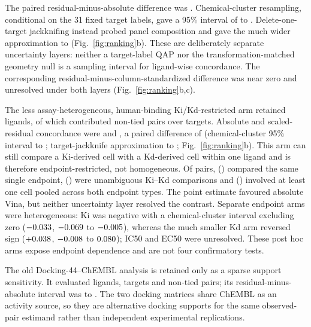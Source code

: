 \documentclass[11pt]{article}
\begin{document}
The paired residual-minus-absolute difference was \BroadRankingDelta{}. Chemical-cluster
resampling, conditional on the 31 fixed target labels, gave a 95\% interval of
\BroadRankingSamplingLow{} to \BroadRankingSamplingHigh{}. Delete-one-target jackknifing
instead probed panel composition and gave the much wider approximation
\BroadRankingTargetJackknifeLow{} to \BroadRankingTargetJackknifeHigh{}
(Fig.~\ref{fig:ranking}b). These are deliberately separate uncertainty layers: neither a
target-label QAP nor the transformation-matched geometry null is a sampling interval for
ligand-wise concordance. The corresponding residual-minus-column-standardized difference
was near zero and unresolved under both layers (Fig.~\ref{fig:ranking}b,c).

The less assay-heterogeneous, human-binding Ki/Kd-restricted arm retained
\BroadHumanKiKdRetainedLigands{} ligands,
of which \BroadHumanKiKdEvaluatedLigands{} contributed \BroadHumanKiKdPairs{} non-tied
pairs over \BroadHumanKiKdTargets{} targets. Absolute and scaled-residual concordance were
\BroadHumanKiKdAbsolute{} and \BroadHumanKiKdResidual{}, a paired difference of
\BroadHumanKiKdDelta{} (chemical-cluster 95\% interval
\BroadHumanKiKdSamplingLow{} to \BroadHumanKiKdSamplingHigh{}; target-jackknife
approximation \BroadHumanKiKdTargetJackknifeLow{} to
\BroadHumanKiKdTargetJackknifeHigh{}; Fig.~\ref{fig:ranking}b). This arm can still compare a
Ki-derived cell with a Kd-derived cell within one ligand and is therefore endpoint-restricted,
not homogeneous. Of \BroadHumanKiKdPairs{} pairs,
\BroadHumanKiKdSameEndpointPairs{} (\BroadHumanKiKdSameEndpointPercent{}) compared the same
single endpoint, \BroadHumanKiKdMixedEndpointPairs{}
(\BroadHumanKiKdMixedEndpointPercent{}) were unambiguous Ki--Kd comparisons and
\BroadHumanKiKdPooledCellPairs{} (\BroadHumanKiKdPooledCellPercent{}) involved at least one
cell pooled across both endpoint types. The point estimate favoured absolute Vina, but neither
uncertainty layer resolved the contrast. Separate endpoint arms were heterogeneous: Ki was
negative with a chemical-cluster interval excluding zero
($-0.033{}$, $-0.069{}$ to $-0.005{}$), whereas the much
smaller Kd arm reversed sign ($+0.038{}$, $-0.008{}$ to
$0.080{}$); IC50 and EC50 were unresolved. These post hoc arms expose
endpoint dependence and are not four confirmatory tests.

The old Docking-44--ChEMBL analysis is retained only as a sparse support sensitivity. It
evaluated \SparseRankingEvaluatedLigands{} ligands, \SparseRankingTargets{} targets and
\SparseRankingPairs{} non-tied pairs; its residual-minus-absolute interval was
\RankingResidualAbsoluteLow{} to \RankingResidualAbsoluteHigh{}. The two docking matrices
share ChEMBL as an activity source, so they are alternative docking supports for the same
observed-pair estimand rather than independent experimental replications.
\end{document}
